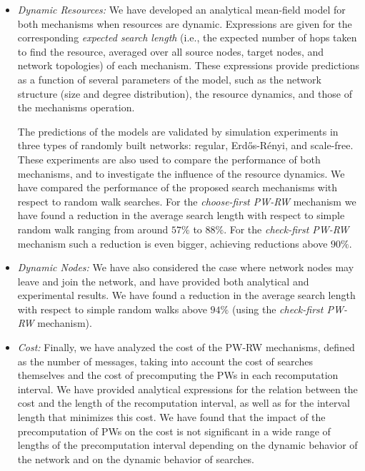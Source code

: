 \documentclass[]{elsarticle}
\newcommand{\ER}	{Erd\H{o}s-R\'{e}nyi}
\begin{document}
\begin{itemize}
\item{\it Dynamic Resources:}
We have developed an analytical mean-field model for both mechanisms when resources are dynamic. Expressions are given for the corresponding \emph{expected search length} (i.e., the expected number of hops taken to find the resource, averaged over all source nodes, target nodes, and network topologies) of each mechanism. These expressions provide predictions as a function of several parameters of the model, such as the network structure (size and degree distribution), the resource dynamics, and those of the mechanisms operation.

The predictions of the models are validated by simulation experiments in three types of randomly built networks: regular, \ER, and scale-free. These experiments are also used to compare the performance of both mechanisms, and to investigate the influence of the resource dynamics. We have  compared the performance of the proposed search mechanisms with respect to random walk searches. For the \emph{choose-first PW-RW} mechanism we have found a reduction in the average search length with respect to simple random walk ranging from around $57\%$ to $88\%$. For the \emph{check-first PW-RW} mechanism such a reduction is even bigger, achieving reductions above $90\%$.

\item{\it Dynamic Nodes:}
We have also considered the case where network nodes may leave and join the network, and have provided both analytical and experimental results. We have found a reduction in the average search length with respect to simple random walks above $94\%$ (using the \emph{check-first PW-RW} mechanism).

\item{\it Cost:}
Finally, we have analyzed the cost of the PW-RW mechanisms, defined as the number of messages, taking into account the cost of searches themselves and the cost of precomputing the PWs in each recomputation interval. We have provided analytical expressions for the relation between the cost and the length of the recomputation interval, as well as for the interval length that minimizes this cost. We have found that the impact of the precomputation of PWs on the cost is not significant in a wide range of lengths of the precomputation interval depending on the dynamic behavior of the network and on the dynamic behavior of searches.

\end{itemize}
\end{document}
